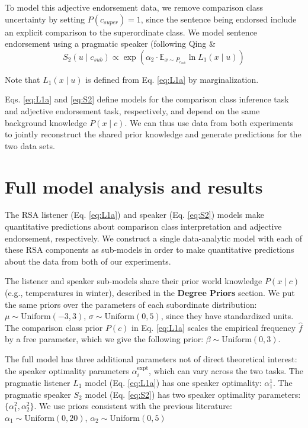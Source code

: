 \documentclass[doc]{apa6}
\begin{document}
To model this adjective endorsement data, we remove comparison class
uncertainty by setting \(P(c_{super}) = 1\), since the sentence being
endorsed include an explicit comparison to the superordinate class. We
model sentence endorsement using a pragmatic speaker (following Qing \&
\begin{equation}
S_{2}(u \mid c_{sub}) \propto \exp{(\alpha_2 \cdot {\mathbb E}_{x\sim P_{c_{sub}}} \ln{L_1(x \mid u)})} \label{eq:S2}
\end{equation} 



\noindent Note that $L_1(x \mid u)$ is defined from Eq.
\ref{eq:L1a} by marginalization.

Eqs. \ref{eq:L1a} and \ref{eq:S2} define models for the comparison class
inference task and adjective endorsement task, respectively, and depend
on the same background knowledge \(P(x\mid c)\). We can thus use data
from both experiments to jointly reconstruct the shared prior knowledge
and generate predictions for the two data sets.


\section{Full model analysis and
results}

The RSA listener (Eq. \ref{eq:L1a}) and speaker (Eq. \ref{eq:S2}) models
make quantitative predictions about comparison class interpretation and
adjective endorsement, respectively. We construct a single data-analytic
model with each of these RSA components as sub-models in order to make
quantitative predictions about the data from both of our experiments.

The listener and speaker sub-models share their prior world knowledge
\(P(x \mid c)\) (e.g., temperatures in winter), described in the
\textbf{Degree Priors} section. We put the same priors over the
parameters of each subordinate distribution:
\(\mu \sim \text{Uniform}(-3, 3)\),
\(\sigma \sim \text{Uniform}(0, 5)\), since they have standardized
units. The comparison class prior \(P(c)\) in Eq. \ref{eq:L1a} scales
the empirical frequency \(\hat{f}\) by a free parameter, which we give
the following prior: \(\beta \sim \text{Uniform}(0, 3)\).

The full model has three additional parameters not of direct theoretical
interest: the speaker optimality parameters \(\alpha^\text{expt}_{i}\),
which can vary across the two tasks. The pragmatic listener \(L_1\)
model (Eq. \ref{eq:L1a}) has one speaker optimality:
\(\alpha^\text{1}_{1}\). The pragmatic speaker \(S_2\) model (Eq.
\ref{eq:S2}) has two speaker optimality parameters:
\(\{\alpha^\text{2}_{1}, \alpha^\text{2}_{2}\}\). We use priors
consistent with the previous literature:
\(\alpha_1 \sim \text{Uniform}(0, 20)\),
\(\alpha_2 \sim \text{Uniform}(0, 5)\)
\end{document}
